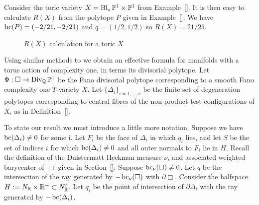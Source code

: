 \begin{example}
Consider the toric variety \(X = \operatorname{Bl}_z \mathbb{P}^1 \times \mathbb{P}^1\) from Example~\ref{}. It is then easy to calculate \(R(X)\) from the polytope \(P\) given in Example~\ref{}. We have \(\mathop{\rm bc}\nolimits(P) = (-2/21,-2/21)\) and \(q = (1/2,1/2)\) so \(R(X) = 21/25\).
\begin{figure}[h]
\centering
	\caption{$R(X)$ calculation for a toric $X$}
\end{figure}
\end{example}

Using similar methods to \cite{datar2016kahler} we obtain an effective formula for manifolds with a torus action of complexity one, in terms its divisorial polytope. Let \(\Phi: \Box \to \operatorname{Div}_{\mathbb{Q}} \mathbb{P}^1\) be the Fano divisorial polytope corresponding to a smooth Fano complexity one \(T\)-variety \(X\). Let \(\{\Delta_i\}_{i=1,\dots,r}\) be the finite set of degeneration polytopes corresponding to central fibres of the non-product test configurations of \(X\), as in Definition~\ref{}.

To state our result we must introduce a little more notation. Suppose we have \(\mathop{\rm bc}\nolimits(\Delta_i) \neq 0\) for some i. Let \(F_i\) be  the face of \(\Delta_i\) in which \(q_i\) lies, and let \(S\) be the set of indices \(i\) for which \(\mathop{\rm bc}\nolimits(\Delta_i) \neq 0\) and all outer normals to \(F_i\) lie in \(H\). Recall the definition of the Duistermatt Heckman measure \(\nu\), and associated weighted barycenter of \(\Box\) given in Section~\ref{}. Suppose \(\mathop{\rm bc}\nolimits_\nu(\Box) \neq 0\). Let \(q\) be the intersection of the ray generated by \(-\mathop{\rm bc}\nolimits_\nu(\Box)\) with \(\partial \Box\). Consider the halfspace \(H := N_{\mathbb{R}} \times \mathbb{R}^+ \subset N'_{\mathbb{R}}\). Let \(q_i\) be the point of intersection of \(\partial \Delta_i\) with the ray generated by \(-\mathop{\rm bc}\nolimits(\Delta_i)\).

